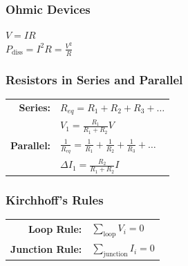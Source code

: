 \documentclass[11pt, twocolumn]{article}
\begin{document}
\subsubsection*{Ohmic Devices}
\begin{center}
$V = IR$\\
$P_\mathrm{diss} = I^2 R = \frac{V^2}{R}$
\end{center}

\subsubsection*{Resistors in Series and Parallel}
\begin{center}

{\renewcommand{\arraystretch}{1.5}
\begin{tabular}{rl}
\textbf{Series:}   & $R_{eq} = R_1 + R_2 + R_3 + \ldots$\\
                   & $V_1 = \frac{R_1}{R_1 + R_2} V$\\
\textbf{Parallel:} & $\frac{1}{R_{eq}} = \frac{1}{R_1} + \frac{1}{R_2} + \frac{1}{R_3} + \ldots$\\
                   & $\Delta I_1 = \frac{R_2}{R_1 + R_2} I$ 
\end{tabular}
}
\end{center}

\subsubsection*{Kirchhoff's Rules}
\begin{center}
{\renewcommand{\arraystretch}{1.5}
\begin{tabular}{rl}
\textbf{Loop Rule:}     & $\sum_\mathrm{loop} V_i = 0$\\
\textbf{Junction Rule:} & $\sum_\mathrm{junction} I_i = 0$
\end{tabular}
}
\end{center}
\end{document}
